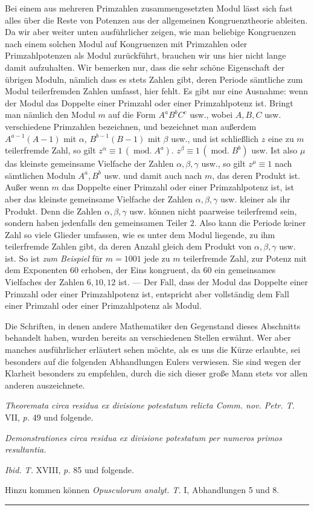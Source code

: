 Bei einem aus mehreren Primzahlen zusammengesetzten Modul lässt sich fast alles über die Reste von Potenzen aus der allgemeinen Kongruenztheorie ableiten. Da wir aber weiter unten ausführlicher zeigen, wie man beliebige Kongruenzen nach einem solchen Modul auf Kongruenzen mit Primzahlen oder Primzahlpotenzen als Modul zurückführt, brauchen wir uns hier nicht lange damit aufzuhalten. Wir bemerken nur, dass die sehr schöne Eigenschaft der übrigen Moduln, nämlich dass es stets Zahlen gibt, deren Periode sämtliche zum Modul teilerfremden Zahlen umfasst, hier fehlt. Es gibt nur eine Ausnahme: wenn der Modul das Doppelte einer Primzahl oder einer Primzahlpotenz ist.
Bringt man nämlich den Modul $m$ auf die Form $A^aB^bC^c$ usw., wobei $A,B,C$ usw. verschiedene Primzahlen bezeichnen, und bezeichnet man außerdem $A^{a-1}(A-1)$ mit $\alpha$, $B^{b-1}(B-1)$ mit $\beta$ usw., und ist schließlich $z$ eine zu $m$ teilerfremde Zahl, so gilt $z^{\alpha}\equiv1\,(\operatorname{mod.}A^a)$. $z^{\beta}\equiv1\,(\operatorname{mod.}B^b)$ usw. Ist also $\mu$ das kleinste gemeinsame Vielfache der Zahlen $\alpha,\beta,\gamma$ usw., so gilt $z^{\mu}\equiv1$ nach sämtlichen Moduln $A^a,B^b$ usw. und damit auch nach $m$, das deren Produkt ist. Außer wenn $m$ das Doppelte einer Primzahl oder einer Primzahlpotenz ist, ist aber das kleinste gemeinsame Vielfache der Zahlen $\alpha,\beta,\gamma$ usw. kleiner als ihr Produkt. Denn die Zahlen $\alpha,\beta,\gamma$ usw. können nicht paarweise teilerfremd sein, sondern haben jedenfalls den gemeinsamen Teiler $2$. Also kann die Periode keiner Zahl
so viele Glieder umfassen, wie es unter dem Modul liegende, zu ihm teilerfremde Zahlen gibt, da deren Anzahl gleich dem Produkt von $\alpha,\beta,\gamma$ usw. ist. So ist \emph{zum Beispiel} für $m=1001$ jede zu $m$ teilerfremde Zahl, zur Potenz mit dem Exponenten $60$ erhoben, der Eins kongruent, da $60$ ein gemeinsames Vielfaches der Zahlen $6,10,12$ ist. --- Der Fall, dass der Modul das Doppelte einer Primzahl oder einer Primzahlpotenz ist, entspricht aber vollständig dem Fall einer Primzahl oder einer Primzahlpotenz als Modul.

Die Schriften, in denen andere Mathematiker den Gegenstand dieses Abschnitts behandelt haben, wurden bereits an verschiedenen Stellen erwähnt. Wer aber manches ausführlicher erläutert sehen möchte, als es uns die Kürze erlaubte, sei besonders auf die folgenden Abhandlungen Eulers verwiesen. Sie sind wegen der Klarheit besonders zu empfehlen, durch die sich dieser große Mann stets vor allen anderen auszeichnete.

\emph{Theoremata circa residua ex divisione potestatum relicta Comm. nov. Petr. T.} VII, \emph{p.} 49 und folgende.

\emph{Demonstrationes circa residua ex divisione potestatum per numeros primos resultantia.}\par
\hspace*{\parindent}\emph{Ibid. T.} XVIII, \emph{p.} 85 und folgende.

Hinzu kommen können \emph{Opusculorum analyt. T.} I, Abhandlungen 5 und 8.

\begin{center}\rule{.28\linewidth}{.25pt}\end{center}
